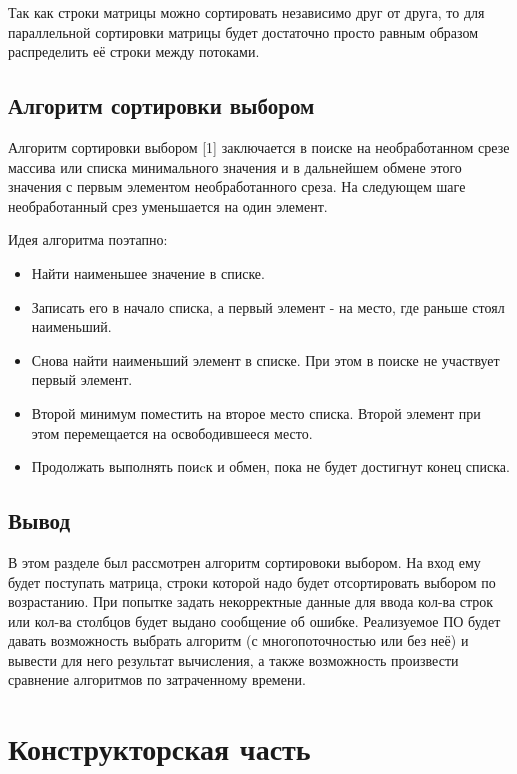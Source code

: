 \documentclass[a4paper,14pt, unknownkeysallowed]{extreport}
\begin{document}
Так как строки матрицы можно сортировать независимо друг от друга, то для параллельной сортировки матрицы будет достаточно просто равным образом распределить её строки между потоками.

\clearpage

\section{Алгоритм сортировки выбором}

Алгоритм сортировки выбором [1] заключается в поиске на необработанном срезе массива или списка минимального значения и в дальнейшем обмене этого значения с первым элементом необработанного среза. На следующем шаге необработанный срез уменьшается на один элемент.

Идея алгоритма поэтапно:
\begin{itemize}
    \item Найти наименьшее значение в списке.
    \item Записать его в начало списка, а первый элемент - на место, где раньше стоял наименьший.
    \item Снова найти наименьший элемент в списке. При этом в поиске не участвует первый элемент.
    \item Второй минимум поместить на второе место списка. Второй элемент при этом перемещается на освободившееся место.
    \item Продолжать выполнять поиcк и обмен, пока не будет достигнут конец списка.
\end{itemize}

\section{Вывод}

В этом разделе был рассмотрен алгоритм сортировоки выбором. На вход ему будет поступать матрица, строки которой надо будет отсортировать выбором по возрастанию. При попытке задать некорректные данные для ввода кол-ва строк или кол-ва столбцов будет выдано сообщение об ошибке. Реализуемое ПО будет давать возможность выбрать алгоритм (с многопоточностью или без неё) и вывести для него результат вычисления, а также возможность произвести сравнение алгоритмов по затраченному времени.



\chapter{Конструкторская часть}
\end{document}
